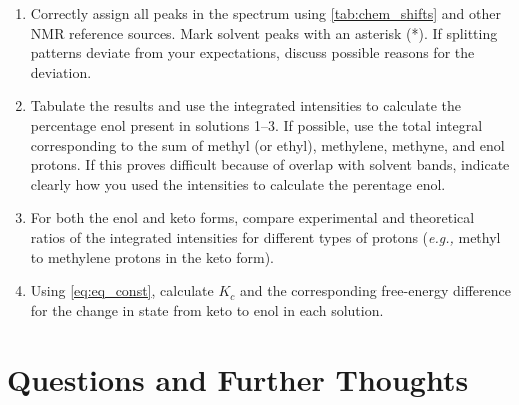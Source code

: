 \documentclass[nobib,nofonts,nols,nohyper,draft]{tufte-handout}
\begin{document}
\begin{enumerate}
	\item Correctly assign all peaks in the spectrum using \cref{tab:chem_shifts} and other NMR reference sources.\autocite{davis1965advanced,pople1959nmr,silverstein2005spec,burdett1964a,rogers1956a}
	Mark solvent peaks with an asterisk (*). If splitting patterns deviate from your expectations, discuss possible reasons for the deviation. 
	\item Tabulate the results and use the integrated intensities to calculate the percentage enol present in solutions \numrange{1}{3}. 
	If possible, use the total integral corresponding to the sum of methyl (or ethyl), methylene, methyne, and enol protons. 
	If this proves difficult because of overlap with solvent bands, indicate clearly how you used the intensities to calculate the perentage enol. 
	\item For both the enol and keto forms, compare experimental and theoretical ratios of the integrated intensities for different types of protons (\emph{e.g.,} methyl to methylene protons in the keto form). 
	\item Using \cref{eq:eq_const}, calculate \( K_c \) and the corresponding free-energy difference  for the change in state from keto to enol in each solution. 
\end{enumerate}


\section{Questions and Further Thoughts} %
\label{sec:questions_and_further_thoughts}
\end{document}
